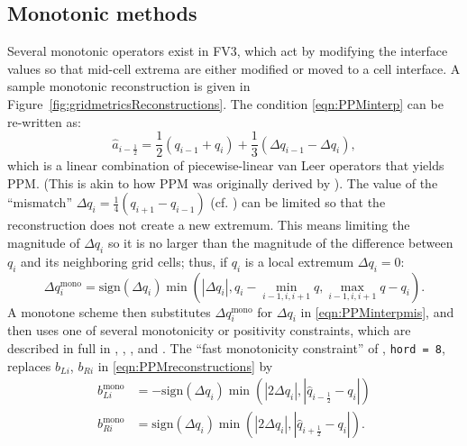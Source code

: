 \documentclass[10pt,letterpaper,margin=1in]{memoir}
\newcommand{\half}{\frac{1}{2}}
\begin{document}
\subsection{Monotonic methods}

Several monotonic operators exist in FV3, which act by modifying the interface values so that mid-cell extrema are either modified or moved to a cell interface. A sample monotonic reconstruction is given in Figure~\ref{fig:gridmetricsReconstructions}.
The condition \eqref{eqn:PPMinterp} can be re-written as:
\begin{equation}
\widehat{a}_{i-\half} = \frac{1}{2} \left (q_{i-1} + q_{i} \right ) + \frac{1}{3} \left ( \Delta q_{i-1} - \Delta q_{i} \right ), \label{eqn:PPMinterpmis}
\end{equation}
which is a linear combination of piecewise-linear van Leer operators that yields PPM. (This is akin to how PPM was originally derived by \citet{CW84}). The value of the ``mismatch'' $\Delta q_{i} = \frac{1}{4}\left(q_{i+1} - q_{i-1} \right )$ (cf. \citet{L94}) can be limited so that the reconstruction does not create a new extremum. This means limiting the magnitude of $\Delta q_{i}$ so it is no larger than the magnitude of the difference between $q_i$ and its neighboring grid cells; thus, if $q_i$ is a local extremum $\Delta q_{i} = 0$:
\begin{equation}
\Delta q_{i}^{\mathrm{mono}} = \mathrm{sign} \left ( \Delta q_{i} \right ) \min \left ( \left | \Delta q_{i}\right |,  q_i - \min_{i-1,i,i+1} q, \max_{i-1,i,i+1} q - q_i \right ).
\end{equation}
A monotone scheme then substitutes $\Delta q_i^{\mathrm{mono}}$ for $\Delta q_i$ in \eqref{eqn:PPMinterpmis}, and then uses one of several monotonicity or positivity constraints, which are described in full in \citet{L94}, \citet{LR96}, \citet{L04}, and \citet{PL07}. The ``fast monotonicity constraint'' of \citet{L04}, \texttt{hord = 8}, replaces $b_{Li}$, $b_{Ri}$ in \eqref{eqn:PPMreconstructions} by
\begin{equation} \label{eqn:monoconstraint}
\begin{split}
b_{Li}^{\mathrm{mono}} &= -\mathrm{sign} \left ( \Delta q_i \right ) \min \left ( | 2 \Delta q_i | , | \widehat{q}_{i-\half} - q_i | \right ) \\
b_{Ri}^{\mathrm{mono}} &= \mathrm{sign} \left ( \Delta q_i \right ) \min \left ( | 2 \Delta q_i | , | \widehat{q}_{i+\half} - q_i | \right ) .
\end{split}
\end{equation}
\end{document}
